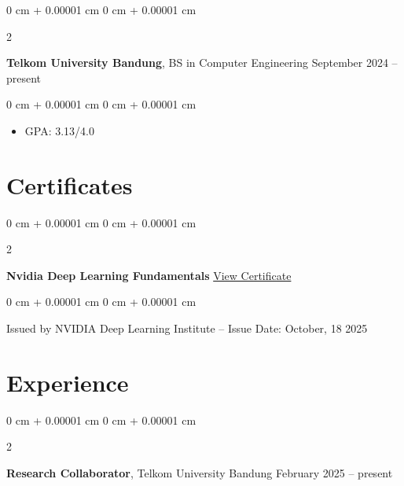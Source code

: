 \documentclass[10pt, a4paper]{article}
\newenvironment{highlights}{
    \begin{itemize}[
        topsep=0.10 cm,
        parsep=0.10 cm,
        partopsep=0pt,
        itemsep=0pt,
        leftmargin=0 cm + 10pt
    ]
}{
    \end{itemize}
} %
\newenvironment{onecolentry}{
    \begin{adjustwidth}{
        0 cm + 0.00001 cm
    }{
        0 cm + 0.00001 cm
    }
}{
    \end{adjustwidth}
} %
\newenvironment{twocolentry}[2][]{
    \onecolentry
    \def\secondColumn{#2}
    \setcolumnwidth{\fill, 4.5 cm}
    \begin{paracol}{2}
}{
    \switchcolumn \raggedleft \secondColumn
    \end{paracol}
    \endonecolentry
} %
\begin{document}
        \begin{twocolentry}{
            September 2024 – present
        }
            \textbf{Telkom University Bandung}, BS in Computer Engineering\end{twocolentry}

        \vspace{0.10 cm}
        \begin{onecolentry}
            \begin{highlights}
                \item GPA: 3.13/4.0
            \end{highlights}
        \end{onecolentry}


    
    \section{Certificates}
        \begin{twocolentry}{
            \href{https://learn.nvidia.com/certificates?id=1obDtIR5SJWcCdQ3BAuFSg}{View Certificate}
        }
            \textbf{Nvidia Deep Learning Fundamentals}\end{twocolentry}

        \vspace{0.10 cm}
        \begin{onecolentry}
            Issued by NVIDIA Deep Learning Institute – Issue Date: October, 18 2025
        \end{onecolentry}

    \section{Experience}

        \begin{twocolentry}{
            February 2025 – present
        }
            \textbf{Research Collaborator}, Telkom University Bandung\end{twocolentry}
\end{document}
